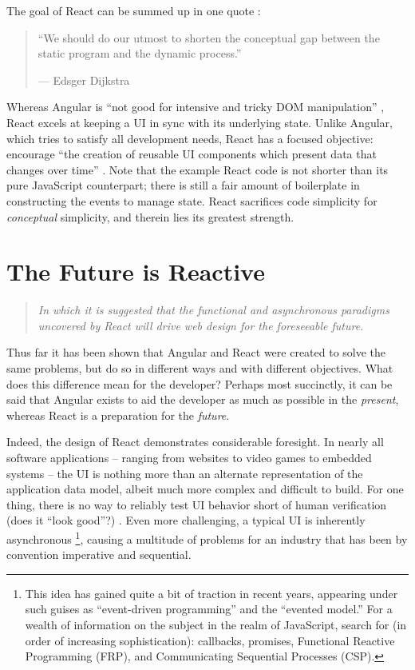 \documentclass[12pt,letterpaper]{article}
\begin{document}
The goal of React can be summed up in one quote \cite{Hunt:2014}:

\begin{quote}
	\singlespacing
	``We should do our utmost to shorten the conceptual gap between the static program and the dynamic process.''

	\raggedleft --- Edsger Dijkstra
\end{quote}

\noindent Whereas Angular is ``not good for intensive and tricky DOM manipulation'' \cite[p.~2]{Angular:Docs}, React excels at keeping a UI in sync with its underlying state. Unlike Angular, which tries to satisfy all development needs, React has a focused objective: encourage ``the creation of reusable UI components which present data that changes over time'' \cite[p.~1]{Hunt:2013}. Note that the example React code is not shorter than its pure JavaScript counterpart; there is still a fair amount of boilerplate in constructing the events to manage state. React sacrifices code simplicity for \emph{conceptual} simplicity, and therein lies its greatest strength.


\section{The Future is Reactive}
\vspace{-12pt}

\begin{quote}
	\singlespacing
	\emph{In which it is suggested that the functional and asynchronous paradigms uncovered by React will drive web design for the foreseeable future.}
\end{quote}

Thus far it has been shown that Angular and React were created to solve the same problems, but do so in different ways and with different objectives. What does this difference mean for the developer? Perhaps most succinctly, it can be said that Angular exists to aid the developer as much as possible in the \emph{present}, whereas React is a preparation for the \emph{future}.

Indeed, the design of React demonstrates considerable foresight. In nearly all software applications -- ranging from websites to video games to embedded systems -- the UI is nothing more than an alternate representation of the application data model, albeit much more complex and difficult to build. For one thing, there is no way to reliably test UI behavior short of human verification (does it ``look good''?) \cite{Hunt:2014}. Even more challenging, a typical UI is inherently asynchronous \footnote{This idea has gained quite a bit of traction in recent years, appearing under such guises as ``event-driven programming'' and the ``evented model.'' For a wealth of information on the subject in the realm of JavaScript, search for (in order of increasing sophistication): callbacks, promises, Functional Reactive Programming (FRP), and Communicating Sequential Processes (CSP).}, causing a multitude of problems for an industry that has been by convention imperative and sequential.
\end{document}
